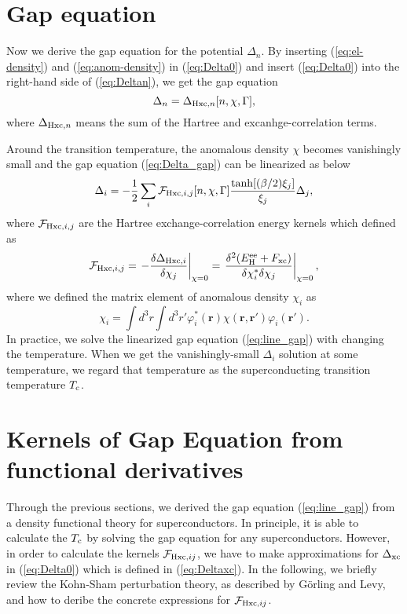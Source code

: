 \section{Gap equation}
%
Now we derive the gap equation for the potential $\Delta_n$. By inserting (\ref{eq:el-density}) 
and (\ref{eq:anom-density}) in (\ref{eq:Delta0}) and insert (\ref{eq:Delta0}) into the 
right-hand side of (\ref{eq:Deltan}), we get the gap equation
%
\begin{equation}
	\Delta_n = \Delta_{{\rm Hxc}, n}[n, \chi, \Gamma],
	\label{eq:Delta_gap}
\end{equation}
%
where $\Delta_{{\rm Hxc},n}$ means the sum of the Hartree and excanhge-correlation terms.

Around the transition temperature, the anomalous density $\chi$ becomes vanishingly small 
and the gap equation (\ref{eq:Delta_gap}) can be linearized as below
%
\begin{equation}
	\Delta_i = -\frac{1}{2}\sum_{i} {\mathcal F}_{{\rm Hxc}, i,j}[n, \chi, \Gamma]
	\frac{\tanh[(\beta/2)\xi_j]}{\xi_j}\Delta_j,
	\label{eq:line_gap}
\end{equation}
%
where ${\mathcal F}_{{\rm Hxc}, i,j}$ are the Hartree exchange-correlation energy kernels which defined as
%
\begin{equation}
	{\mathcal F}_{{\rm Hxc},i,j} = \left. -\frac{\delta \Delta_{{\rm Hxc}, i}}{\delta \chi_j} 
	                               \right|_{\chi = 0}
				       = \left. \frac{\delta^2(E^{\rm ee}_{\rm H}+F_{\rm xc})}
				       {\delta \chi^{\ast}_i \delta \chi_j} \right|_{\chi = 0},
	\label{eq:def-fxc}
\end{equation}
%
where we defined the matrix element of anomalous density $\chi_i$ as
%
\begin{equation}
	\chi_i = \int d^3r\int d^3r' \varphi^{\ast}_i(\bm{r})\chi(\bm{r}, \bm{r'})\varphi_i(\bm{r'}).
	\label{eq:chi_i_def}
\end{equation}
%
In practice, we solve the linearized gap equation (\ref{eq:line_gap}) with changing the temperature. 
When we get the vanishingly-small $\Delta_i$ solution at some temperature, we regard that temperature
as the superconducting transition temperature $T_{\rm c}$.
%

\section{Kernels of Gap Equation from functional derivatives}

Through the previous sections, we derived the gap equation (\ref{eq:line_gap}) from a density functional
theory for superconductors. In principle, it is able to calculate the $T_{\rm c}$ by solving 
the gap equation for any superconductors. However, in order to calculate the kernels 
${\mathcal F}_{{\rm Hxc},ij}$, 
we have to make approximations for $\Delta_{\rm xc}$ in (\ref{eq:Delta0}) which is defined in
(\ref{eq:Deltaxc}). In the following, we briefly review the Kohn-Sham perturbation theory,
as described by G\"{o}rling and Levy\cite{Levy1994}, 
and how to deribe the concrete expressions for ${\mathcal F}_{{\rm Hxc},ij}$.

